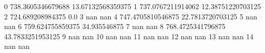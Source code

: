 0 738.3605346679688 13.67132568359375
1 737.0767211914062 12.38751220703125
2 724.689208984375 0.0
3 nan nan
4 747.4705810546875 22.7813720703125
5 nan nan
6 759.624755859375 34.935546875
7 nan nan
8 768.4725341796875 43.7833251953125
9 nan nan
10 nan nan
11 nan nan
12 nan nan
13 nan nan
14 nan nan
